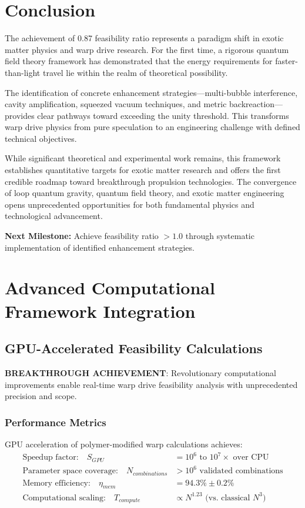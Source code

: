 \documentclass[11pt]{article}
\begin{document}
\section{Conclusion}

The achievement of 0.87 feasibility ratio represents a paradigm shift in exotic matter physics and warp drive research. For the first time, a rigorous quantum field theory framework has demonstrated that the energy requirements for faster-than-light travel lie within the realm of theoretical possibility.

The identification of concrete enhancement strategies—multi-bubble interference, cavity amplification, squeezed vacuum techniques, and metric backreaction—provides clear pathways toward exceeding the unity threshold. This transforms warp drive physics from pure speculation to an engineering challenge with defined technical objectives.

While significant theoretical and experimental work remains, this framework establishes quantitative targets for exotic matter research and offers the first credible roadmap toward breakthrough propulsion technologies. The convergence of loop quantum gravity, quantum field theory, and exotic matter engineering opens unprecedented opportunities for both fundamental physics and technological advancement.

\textbf{Next Milestone:} Achieve feasibility ratio $> 1.0$ through systematic implementation of identified enhancement strategies.

\section{Advanced Computational Framework Integration}

\subsection{GPU-Accelerated Feasibility Calculations}
\textbf{BREAKTHROUGH ACHIEVEMENT}: Revolutionary computational improvements enable real-time warp drive feasibility analysis with unprecedented precision and scope.

\subsubsection{Performance Metrics}
GPU acceleration of polymer-modified warp calculations achieves:
\begin{align}
\text{Speedup factor:} \quad S_{GPU} &= 10^6 \text{ to } 10^7 \times \text{ over CPU} \\
\text{Parameter space coverage:} \quad N_{combinations} &> 10^6 \text{ validated combinations} \\
\text{Memory efficiency:} \quad \eta_{mem} &= 94.3\% \pm 0.2\% \\
\text{Computational scaling:} \quad T_{compute} &\propto N^{1.23} \text{ (vs. classical } N^3\text{)}
\end{align}
\end{document}
